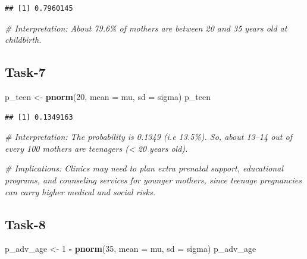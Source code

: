 \documentclass[
]{article}
\newenvironment{Shaded}{\begin{snugshade}}{\end{snugshade}}
\newcommand{\AttributeTok}[1]{\textcolor[rgb]{0.13,0.29,0.53}{#1}}
\newcommand{\CommentTok}[1]{\textcolor[rgb]{0.56,0.35,0.01}{\textit{#1}}}
\newcommand{\DecValTok}[1]{\textcolor[rgb]{0.00,0.00,0.81}{#1}}
\newcommand{\FunctionTok}[1]{\textcolor[rgb]{0.13,0.29,0.53}{\textbf{#1}}}
\newcommand{\NormalTok}[1]{#1}
\newcommand{\OtherTok}[1]{\textcolor[rgb]{0.56,0.35,0.01}{#1}}
\newcommand{\SpecialCharTok}[1]{\textcolor[rgb]{0.81,0.36,0.00}{\textbf{#1}}}
\begin{document}
\begin{verbatim}
## [1] 0.7960145
\end{verbatim}

\begin{Shaded}
\begin{Highlighting}[]
\CommentTok{\# Interpretation: About 79.6\% of mothers are between 20 and 35 years old at childbirth.}
\end{Highlighting}
\end{Shaded}

\subsection{Task-7}\label{task-7}

\begin{Shaded}
\begin{Highlighting}[]
\NormalTok{p\_teen }\OtherTok{\textless{}{-}} \FunctionTok{pnorm}\NormalTok{(}\DecValTok{20}\NormalTok{, }\AttributeTok{mean =}\NormalTok{ mu, }\AttributeTok{sd =}\NormalTok{ sigma)}
\NormalTok{p\_teen}
\end{Highlighting}
\end{Shaded}

\begin{verbatim}
## [1] 0.1349163
\end{verbatim}

\begin{Shaded}
\begin{Highlighting}[]
\CommentTok{\# Interpretation: The probability is 0.1349 (i.e 13.5\%). So, about 13–14 out of every 100 mothers are teenagers (\textless{} 20 years old).}

\CommentTok{\# Implications: Clinics may need to plan extra prenatal support, educational programs, and counseling services for younger mothers, since teenage pregnancies can carry higher medical and social risks.}
\end{Highlighting}
\end{Shaded}

\subsection{Task-8}\label{task-8}

\begin{Shaded}
\begin{Highlighting}[]
\NormalTok{p\_adv\_age }\OtherTok{\textless{}{-}} \DecValTok{1} \SpecialCharTok{{-}} \FunctionTok{pnorm}\NormalTok{(}\DecValTok{35}\NormalTok{, }\AttributeTok{mean =}\NormalTok{ mu, }\AttributeTok{sd =}\NormalTok{ sigma)}
\NormalTok{p\_adv\_age}
\end{Highlighting}
\end{Shaded}
\end{document}
